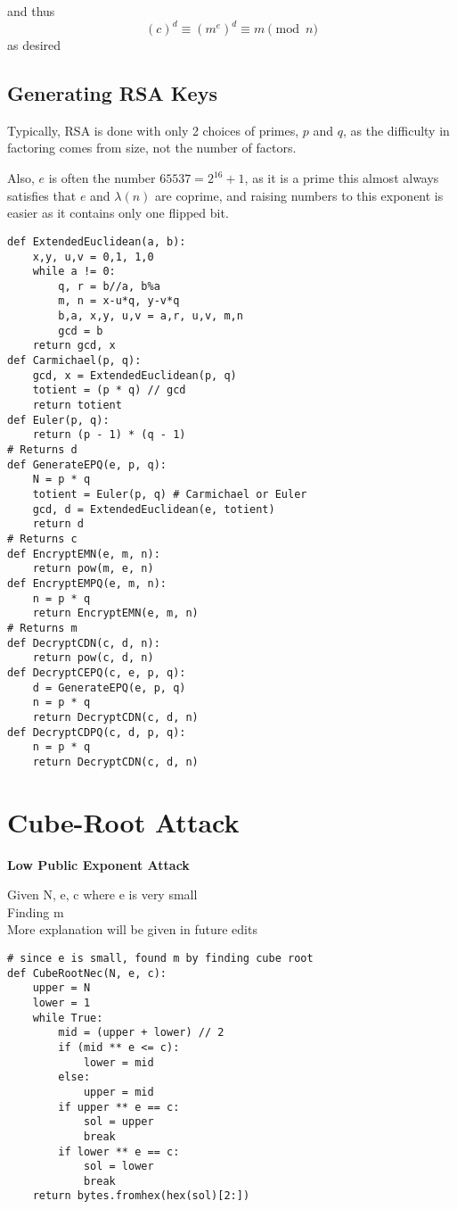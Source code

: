 \documentclass[11pt,notitlepage]{report}
\begin{document}
and thus
$$(c)^d \equiv (m^e)^d \equiv m \pmod{n}$$
as desired

\newpage
\subsection{Generating RSA Keys}

Typically, RSA is done with only 2 choices of primes, $p$ and $q$, as the difficulty in factoring comes from size, not the number of factors.

Also, $e$ is often the number $65537 = 2^{16} + 1$, as it is a prime this almost always satisfies that $e$ and $\lambda(n)$ are coprime, and raising numbers to this exponent is easier as it contains only one flipped bit.

\vspace{-2mm}
\begin{verbatim}
def ExtendedEuclidean(a, b):
    x,y, u,v = 0,1, 1,0
    while a != 0:
        q, r = b//a, b%a
        m, n = x-u*q, y-v*q
        b,a, x,y, u,v = a,r, u,v, m,n
        gcd = b
    return gcd, x
def Carmichael(p, q):
    gcd, x = ExtendedEuclidean(p, q)
    totient = (p * q) // gcd
    return totient
def Euler(p, q):
    return (p - 1) * (q - 1)
# Returns d
def GenerateEPQ(e, p, q):
    N = p * q
    totient = Euler(p, q) # Carmichael or Euler
    gcd, d = ExtendedEuclidean(e, totient)
    return d
# Returns c
def EncryptEMN(e, m, n):
    return pow(m, e, n)
def EncryptEMPQ(e, m, n):
    n = p * q
    return EncryptEMN(e, m, n)
# Returns m
def DecryptCDN(c, d, n):
    return pow(c, d, n)
def DecryptCEPQ(c, e, p, q):
    d = GenerateEPQ(e, p, q)
    n = p * q
    return DecryptCDN(c, d, n)
def DecryptCDPQ(c, d, p, q):
    n = p * q
    return DecryptCDN(c, d, n)
\end{verbatim}


\newpage

\section{Cube-Root Attack}
\vspace{-5mm}
\textbf{Low Public Exponent Attack}

Given N, e, c where e is very small\\
Finding m\\

More explanation will be given in future edits

\begin{verbatim}
# since e is small, found m by finding cube root
def CubeRootNec(N, e, c):
    upper = N
    lower = 1
    while True:
        mid = (upper + lower) // 2
        if (mid ** e <= c):
            lower = mid
        else:
            upper = mid
        if upper ** e == c:
            sol = upper
            break
        if lower ** e == c:
            sol = lower
            break
    return bytes.fromhex(hex(sol)[2:])
\end{verbatim}
\end{document}
